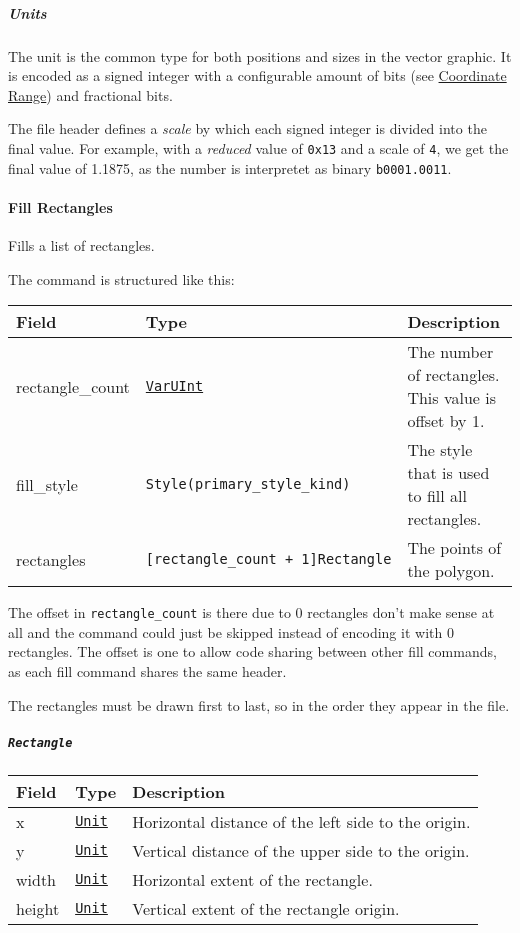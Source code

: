 \documentclass[]{article}
\begin{document}
\hypertarget{units}{%
\subparagraph{Units}\label{units}}

The unit is the common type for both positions and sizes in the vector
graphic. It is encoded as a signed integer with a configurable amount of
bits (see \protect\hyperlink{coordinate-range}{Coordinate Range}) and
fractional bits.

The file header defines a \emph{scale} by which each signed integer is
divided into the final value. For example, with a \emph{reduced} value
of \texttt{0x13} and a scale of \texttt{4}, we get the final value of
1.1875, as the number is interpretet as binary \texttt{b0001.0011}.

\hypertarget{fill-rectangles}{%
\paragraph{Fill Rectangles}\label{fill-rectangles}}

Fills a list of rectangles.

The command is structured like this:

\begin{longtable}[]{@{}lll@{}}
\toprule
Field & Type & Description \\
\midrule
\endhead
rectangle\_count & \protect\hyperlink{varuint}{\texttt{VarUInt}} & The
number of rectangles. This value is offset by 1. \\
fill\_style & \texttt{Style(primary\_style\_kind)} & The style that is
used to fill all rectangles. \\
rectangles & \texttt{{[}rectangle\_count\ +\ 1{]}Rectangle} & The points
of the polygon. \\
\bottomrule
\end{longtable}

The offset in \texttt{rectangle\_count} is there due to 0 rectangles
don't make sense at all and the command could just be skipped instead of
encoding it with 0 rectangles. The offset is one to allow code sharing
between other fill commands, as each fill command shares the same
header.

The rectangles must be drawn first to last, so in the order they appear
in the file.

\hypertarget{rectangle}{%
\subparagraph{\texorpdfstring{\texttt{Rectangle}}{Rectangle}}\label{rectangle}}

\begin{longtable}[]{@{}lll@{}}
\toprule
Field & Type & Description \\
\midrule
\endhead
x & \protect\hyperlink{units}{\texttt{Unit}} & Horizontal distance of
the left side to the origin. \\
y & \protect\hyperlink{units}{\texttt{Unit}} & Vertical distance of the
upper side to the origin. \\
width & \protect\hyperlink{units}{\texttt{Unit}} & Horizontal extent of
the rectangle. \\
height & \protect\hyperlink{units}{\texttt{Unit}} & Vertical extent of
the rectangle origin. \\
\bottomrule
\end{longtable}
\end{document}
